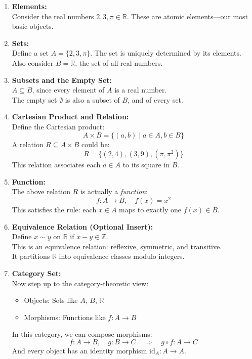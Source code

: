 \documentclass[10pt]{article}
\theoremstyle{plain}
\theoremstyle{definition}
\begin{document}
  \begin{enumerate}
  	\item \textbf{Elements:} \\
  	Consider the real numbers \( 2, 3, \pi \in \mathbb{R} \). These are atomic elements—our most basic objects.
  	
  	\item \textbf{Sets:} \\
  	Define a set \( A = \{2, 3, \pi\} \). The set is uniquely determined by its elements. \\
  	Also consider \( B = \mathbb{R} \), the set of all real numbers.
  	
  	\item \textbf{Subsets and the Empty Set:} \\
  	\( A \subseteq B \), since every element of \( A \) is a real number. \\
  	The empty set \( \emptyset \) is also a subset of \( B \), and of every set.
  	
  	\item \textbf{Cartesian Product and Relation:} \\
  	Define the Cartesian product:
  	\[
  	A \times B = \{ (a, b) \mid a \in A, b \in B \}
  	\]
  	A relation \( R \subseteq A \times B \) could be:
  	\[
  	R = \{ (2, 4), (3, 9), (\pi, \pi^2) \}
  	\]
  	This relation associates each \( a \in A \) to its square in \( B \).
  	
  	\item \textbf{Function:} \\
  	The above relation \( R \) is actually a \emph{function}:
  	\[
  	f : A \to B, \quad f(x) = x^2
  	\]
  	This satisfies the rule: each \( x \in A \) maps to exactly one \( f(x) \in B \).
  	
  	\item \textbf{Equivalence Relation (Optional Insert):} \\
  	Define \( x \sim y \) on \( \mathbb{R} \) if \( x - y \in \mathbb{Z} \). \\
  	This is an equivalence relation: reflexive, symmetric, and transitive. \\
  	It partitions \( \mathbb{R} \) into equivalence classes modulo integers.
  	
  	\item \textbf{Category \textbf{Set}:} \\
  	Now step up to the category-theoretic view:
  	\begin{itemize}
  		\item Objects: Sets like \( A \), \( B \), \( \mathbb{R} \)
  		\item Morphisms: Functions like \( f : A \to B \)
  	\end{itemize}
  	In this category, we can compose morphisms:
  	\[
  	f : A \to B, \quad g : B \to C \quad \Rightarrow \quad g \circ f : A \to C
  	\]
  	And every object has an identity morphism \( \text{id}_A : A \to A \).
  	

\end{enumerate}
\end{document}
